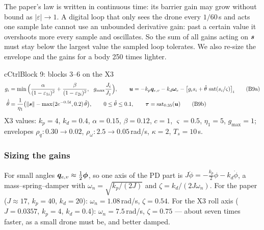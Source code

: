 \begin{idea}
The paper's law is written in continuous time: its barrier gain may grow without bound as $|\varepsilon|\to1$. A digital
loop that only sees the drone every $1/60$\,s and acts one sample late cannot use an unbounded derivative gain: past a
certain value it overshoots more every sample and oscillates. So the sum of all gains acting on $\bm{s}$ must stay below the
largest value the sampled loop tolerates. We also re-size the envelope and the gains for a body 250 times lighter.
\end{idea}

\begin{eqbox}{cCtrl}{Block 9: blocks 3--6 on the X3}
\begin{align}
g_i&=\min\Big(\frac{\alpha}{(1-\varepsilon_{1i})^2}+\frac{\beta}{(1-\varepsilon_{2i})^2},\ \ g_{\max}\frac{J_i}{J_z}\Big),\qquad
\vu=-k_p\vq_{e,v}-k_d\vw_e-\big[g_is_i+\that\,\sat(s_i/\varsigma)\big]_i \tag{B9a}\\
\dot\that&=\frac{1}{\eta_1}\big(\|\vs\|-\max(2e^{-0.5t},0.2)\,\that\big),\qquad 0\le\that\le0.1,\qquad \vtau=\sat_{0.35}(\vu) \tag{B9b}
\end{align}
X3 values: $k_p=4$, $k_d=0.4$, $\alpha=0.15$, $\beta=0.12$, $c=1$, $\varsigma=0.5$, $\eta_1=5$, $g_{\max}=1$;
envelopes $\rho_q:0.30\to0.02$, $\rho_\omega:2.5\to0.05$\,rad/s, $\kappa=2$, $T_s=10$\,s.
\end{eqbox}

\subsubsection*{Sizing the gains}
For small angles $\bm{q}_{e,v}\approx\tfrac12\bm\phi$, so one axis of the PD part is $J\ddot\phi=-\tfrac{k_p}{2}\phi-k_d\dot\phi$, a
mass--spring--damper with $\omega_n=\sqrt{k_p/(2J)}$ and $\zeta=k_d/(2J\omega_n)$. For the paper ($J\approx17$, $k_p=40$,
$k_d=20$): $\omega_n=1.08$\,rad/s, $\zeta=0.54$. For the X3 roll axis ($J=0.0357$, $k_p=4$, $k_d=0.4$): $\omega_n=7.5$\,rad/s,
$\zeta=0.75$ --- about seven times faster, as a small drone must be, and better damped.

